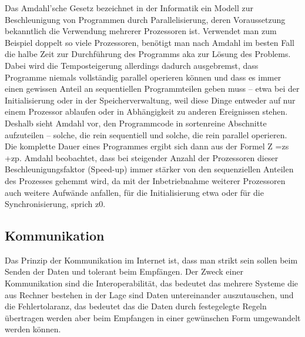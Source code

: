 \documentclass[a4paper,12pt]{article}
\begin{document}
Das Amdahl’sche Gesetz bezeichnet in der Informatik ein Modell zur Beschleunigung von Programmen durch Parallelisierung, deren Voraussetzung bekanntlich die Verwendung mehrerer Prozessoren ist. Verwendet man zum Beispiel doppelt so viele Prozessoren, benötigt man nach Amdahl im besten Fall die halbe Zeit zur Durchführung des Programms aka zur Lösung des Problems. Dabei wird die Temposteigerung allerdings dadurch ausgebremst, dass Programme niemals vollständig parallel operieren können und dass es immer einen gewissen Anteil an sequentiellen Programmteilen geben muss – etwa bei der Initialisierung oder in der Speicherverwaltung, weil diese Dinge entweder auf nur einem Prozessor ablaufen oder in Abhängigkeit zu anderen Ereignissen stehen. Deshalb sieht Amdahl vor, den Programmcode in sortenreine Abschnitte aufzuteilen – solche, die rein sequentiell und solche, die rein parallel operieren. Die komplette Dauer eines Programmes ergibt sich dann aus der Formel Z =zs +zp.
Amdahl beobachtet, dass bei steigender Anzahl der Prozessoren dieser Beschleunigungsfaktor (Speed-up) immer stärker von den sequenziellen Anteilen des Prozesses gehemmt wird, da mit der Inbetriebnahme weiterer Prozessoren auch weitere Aufwände anfallen, für die Initialisierung etwa oder für die Synchronisierung, sprich z0.
\cite{parallelprogramming}
\newpage
\noindent
\subsection{Kommunikation}
Das Prinzip der Kommunikation im Internet ist, dass man strikt sein sollen beim Senden der Daten und tolerant beim Empfängen. Der Zweck einer Kommunikation sind die Interoperabilität, das bedeutet
das mehrere Systeme die aus Rechner bestehen in der Lage sind Daten untereinander auszutauschen, und die Fehlertolaranz, das bedeutet das die Daten durch festegelegte Regeln übertragen werden aber beim Empfangen in einer
gewünschen Form umgewandelt werden können.
\end{document}

